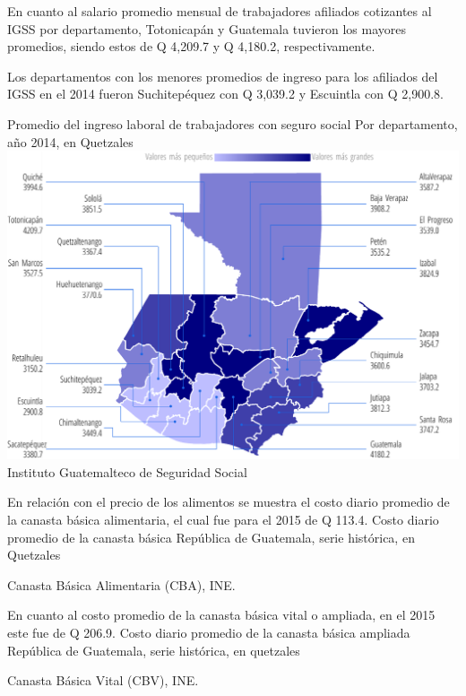   
  {%
  En cuanto al salario promedio mensual de trabajadores afiliados cotizantes al IGSS por departamento, Totonicapán y Guatemala tuvieron los mayores promedios, siendo estos de Q 4,209.7 y Q 4,180.2, respectivamente.
  
  Los departamentos con los menores promedios de ingreso para los afiliados del IGSS en el 2014 fueron Suchitepéquez con Q 3,039.2 y Escuintla con Q 2,900.8.}%
  {%
  	Promedio del ingreso laboral de trabajadores con seguro social
  } %
  {%
  	Por departamento, año 2014, en Quetzales} %
  {%
  	\includegraphics[width=52\cuadri]{graficas/3_06.pdf}}%
  {%
  	Instituto Guatemalteco de Seguridad Social} %


%
{%
En relación con el precio de los alimentos se muestra el costo diario promedio de la canasta básica alimentaria, el cual fue para el 2015 de Q 113.4.}%
{%
Costo  diario promedio de la canasta básica } %
{%
	República de Guatemala, serie histórica, en Quetzales } %
{%
	\begin{tikzpicture}[x=1pt,y=1pt]    \end{tikzpicture}}%
{%
	Canasta Básica Alimentaria (CBA), INE.} %


%
{%
En cuanto al costo promedio de la canasta básica vital o ampliada, en el 2015 este fue de Q 206.9.
}%
{%
	Costo diario promedio  de la canasta básica ampliada } %
{%
	República de Guatemala, serie histórica, en quetzales } %
{%
	\begin{tikzpicture}[x=1pt,y=1pt]    \end{tikzpicture}}%
{%
	Canasta Básica Vital (CBV), INE.} %
